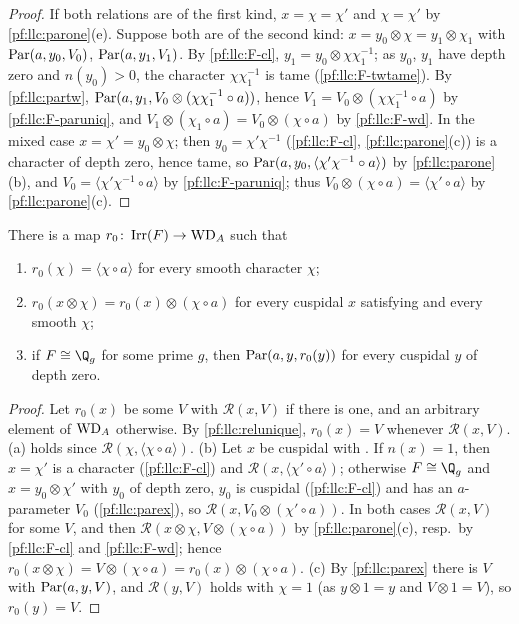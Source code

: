 \begin{proof}
If both relations are of the first kind, $x=\chi=\chi'$ and $\chi=\chi'$ by \cref{pf:llc:parone}(e). Suppose both
are of the second kind: $x=y_0\otimes\chi=y_1\otimes\chi_1$ with $\operatorname{Par}(a,y_0,V_0)$, $\operatorname{Par}(a,y_1,V_1)$. By
\ref{pf:llc:F-cl}, $y_1=y_0\otimes\chi\chi_1^{-1}$; as $y_0$, $y_1$ have depth zero and $n(y_0)>0$, the character
$\chi\chi_1^{-1}$ is tame (\ref{pf:llc:F-twtame}). By \cref{pf:llc:partw},
$\operatorname{Par}(a,y_1,V_0\otimes(\chi\chi_1^{-1}\circ a))$, hence $V_1=V_0\otimes(\chi\chi_1^{-1}\circ a)$ by
\ref{pf:llc:F-paruniq}, and $V_1\otimes(\chi_1\circ a)=V_0\otimes(\chi\circ a)$ by \ref{pf:llc:F-wd}. In the mixed
case $x=\chi'=y_0\otimes\chi$; then $y_0=\chi'\chi^{-1}$ (\ref{pf:llc:F-cl}, \cref{pf:llc:parone}(c)) is a character of
depth zero, hence tame, so $\operatorname{Par}(a,y_0,\langle\chi'\chi^{-1}\circ a\rangle)$ by \cref{pf:llc:parone}(b), and
$V_0=\langle\chi'\chi^{-1}\circ a\rangle$ by \ref{pf:llc:F-paruniq}; thus $V_0\otimes(\chi\circ a)=\langle\chi'\circ a\rangle$
by \cref{pf:llc:parone}(c).
\end{proof}

\begin{proposition}\label{pf:llc:goodmap}
There is a map $r_0\colon\operatorname{Irr}(F)\to\mathrm{WD}_A$ such that
\begin{enumerate}[label=(\alph*)]
\item $r_0(\chi)=\langle\chi\circ a\rangle$ for every smooth character $\chi$;
\item $r_0(x\otimes\chi)=r_0(x)\otimes(\chi\circ a)$ for every cuspidal $x$ satisfying \llcGo{} and every smooth
  $\chi$;
\item if $F\cong\Q_g$ for some prime $g$, then $\operatorname{Par}(a,y,r_0(y))$ for every cuspidal $y$ of depth zero.
\end{enumerate}
\end{proposition}

\begin{proof}
Let $r_0(x)$ be some $V$ with $\mathcal R(x,V)$ if there is one, and an arbitrary element of $\mathrm{WD}_A$ otherwise. By
\cref{pf:llc:relunique}, $r_0(x)=V$ whenever $\mathcal R(x,V)$. (a) holds since $\mathcal R(\chi,\langle\chi\circ a\rangle)$.
(b) Let $x$ be cuspidal with \llcGo{}. If $n(x)=1$, then $x=\chi'$ is a character (\ref{pf:llc:F-cl}) and
$\mathcal R(x,\langle\chi'\circ a\rangle)$; otherwise $F\cong\Q_g$ and $x=y_0\otimes\chi'$ with $y_0$ of depth zero, $y_0$
is cuspidal (\ref{pf:llc:F-cl}) and has an $a$-parameter $V_0$ (\cref{pf:llc:parex}), so
$\mathcal R(x,V_0\otimes(\chi'\circ a))$. In both cases $\mathcal R(x,V)$ for some $V$, and then
$\mathcal R(x\otimes\chi,V\otimes(\chi\circ a))$ by \cref{pf:llc:parone}(c), resp.\ by \ref{pf:llc:F-cl} and
\ref{pf:llc:F-wd}; hence $r_0(x\otimes\chi)=V\otimes(\chi\circ a)=r_0(x)\otimes(\chi\circ a)$. (c) By
\cref{pf:llc:parex} there is $V$ with $\operatorname{Par}(a,y,V)$, and $\mathcal R(y,V)$ holds with $\chi=1$
(as $y\otimes1=y$ and $V\otimes1=V$), so $r_0(y)=V$.
\end{proof}

